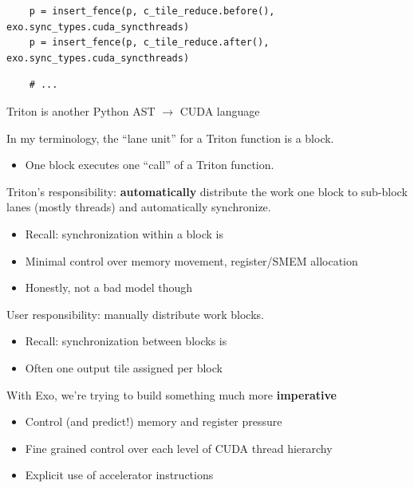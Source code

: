 \begin{minipage}[t]{0.5\textwidth}
{\begin{verbatim}
\end{verbatim}
\begin{mdframed}[style=MyFrame, backgroundcolor=greenBoxBg]
\color{greenBoxFg}
\begin{verbatim}
    p = insert_fence(p, c_tile_reduce.before(), exo.sync_types.cuda_syncthreads)
    p = insert_fence(p, c_tile_reduce.after(), exo.sync_types.cuda_syncthreads)
\end{verbatim}
\end{mdframed}
\begin{verbatim}
    # ...
\end{verbatim}
}
\end{minipage}

\newpage
{}

\begin{minipage}[t]{0.7\textwidth}\fixminipage
Triton is another Python AST $\to$ CUDA language

In my terminology, the ``lane unit'' for a Triton function is a block.
\begin{itemize}
  \item One block executes one ``call'' of a Triton function.
\end{itemize}

Triton's responsibility: \textbf{automatically} distribute the work  one block to sub-block lanes (mostly threads) and automatically synchronize.
\begin{itemize}
  \item Recall: synchronization within a block is 
  \item Minimal control over memory movement, register/SMEM allocation
  \item Honestly, not a bad model though
\end{itemize}

User responsibility: manually distribute work  blocks.
\begin{itemize}
  \item Recall: synchronization between blocks is 
  \item Often one output tile assigned per block
\end{itemize}

With Exo, we're trying to build something much more \textbf{imperative}
\begin{itemize}
  \item Control (and predict!) memory and register pressure
  \item Fine grained control over each level of CUDA thread hierarchy
  \item Explicit use of accelerator instructions
\end{itemize}
\end{minipage}

